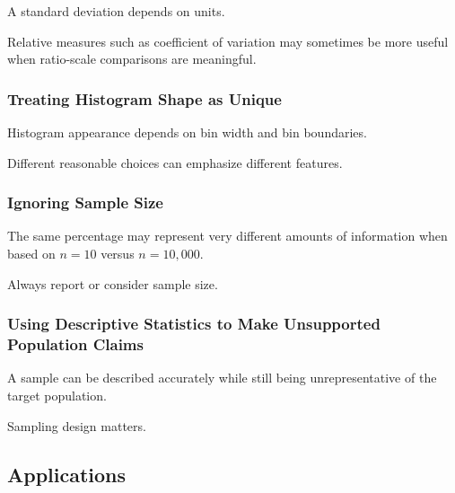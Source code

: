 A standard deviation depends on units.

Relative measures such as coefficient of variation may sometimes be
more useful when ratio-scale comparisons are meaningful.

\subsubsection{Treating Histogram Shape as Unique}

Histogram appearance depends on bin width and bin boundaries.

Different reasonable choices can emphasize different features.

\subsubsection{Ignoring Sample Size}

The same percentage may represent very different amounts of information
when based on \(n=10\) versus \(n=10{,}000\).

Always report or consider sample size.

\subsubsection{Using Descriptive Statistics to Make Unsupported Population Claims}

A sample can be described accurately while still being unrepresentative
of the target population.

Sampling design matters.

\subsection{Applications}
\label{subsec:descriptive-statistics-applications}

